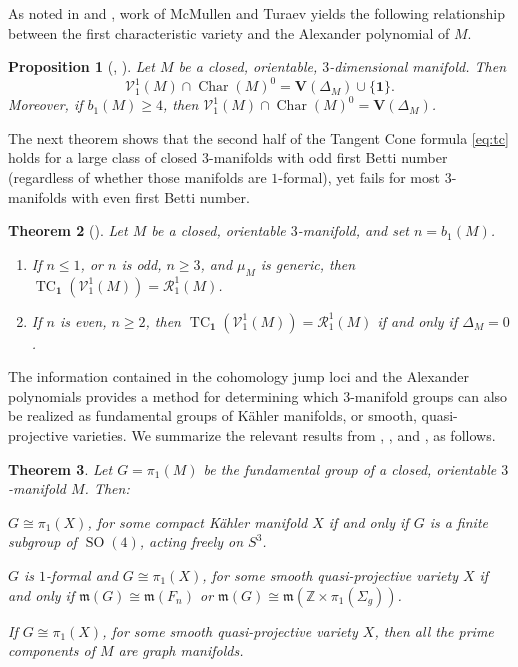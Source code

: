\documentclass{article}
\numberwithin{equation}{section}
\newtheorem{theorem}{Theorem}[section]
\newtheorem{proposition}[theorem]{Proposition}
\theoremstyle{definition}
\newcommand{\Z}{\mathbb{Z}}
\newcommand{\VV}{\mathcal{V}}
\newcommand{\RR}{\mathcal{R}}
\newcommand{\m}{{\mathfrak{m}}}
\DeclareMathOperator{\TC}{TC}
\DeclareMathOperator{\Char}{Char}
\newcommand{\one}{\mathbf{1}}
\begin{document}
As noted in \cite{DPS-imrn} and \cite{Su-mm}, work of McMullen \cite{McM} and 
Turaev \cite{Tu} yields the following relationship between the first 
characteristic variety and the Alexander polynomial of $M$.

\begin{proposition}[\cite{DPS-imrn}, \cite{Su-mm}]
\label{prop:cv 3d}
Let $M$ be a closed, orientable, $3$-dimensional manifold.  Then 
\begin{equation}
\label{eq:vdel}
\VV^1_1(M)\cap \Char(M)^0=\mathbf{V}(\Delta_M) \cup \{\one\}.
\end{equation}
Moreover, if $b_1(M)\ge 4$,  then $\VV^1_1(M)\cap 
\Char(M)^0= \mathbf{V}(\Delta_M)$.  
\end{proposition}

The next theorem shows that the second half of the Tangent Cone formula 
\eqref{eq:tc} holds for a large class of closed $3$-manifolds with odd first 
Betti number (regardless of whether those manifolds are $1$-formal), 
yet fails for most $3$-manifolds with even first Betti number.

\begin{theorem}[\cite{Su-mm}]
\label{thm:tc 3d}
Let $M$ be a closed, orientable $3$-manifold, and 
set $n=b_1(M)$. 
\begin{enumerate}
\item \label{odd} 
If $n\le 1$, or $n$ is odd, $n\ge 3$, and $\mu_M$ 
is generic, then $\TC_{\one}(\VV^1_1(M))=\RR^1_1(M)$.
\item \label{even} 
If $n$ is even, $n\ge 2$, then 
$\TC_{\one}(\VV^1_1(M))= \RR^1_1(M)$ if 
and only if $\Delta_M= 0$.
\end{enumerate}
\end{theorem}

The information contained in the cohomology jump loci and 
the Alexander polynomials provides a method for determining 
which $3$-manifold groups can also be realized as fundamental groups 
of K\"{a}hler manifolds, or smooth, quasi-projective varieties. 
We summarize the relevant results from \cite{DS-jems}, 
\cite{DPS-mz}, and \cite{FS}, as follows.

\begin{theorem}
\label{thm:3d-k-qp}
Let $G=\pi_1(M)$ be the fundamental group of a closed, orientable 
$3$-manifold $M$. Then:
\begin{description}[labelindent=14pt]
\item [\cite{DS-jems}]
$G\cong \pi_1(X)$, for some compact K\"{a}hler manifold $X$ if and only if 
$G$ is a finite subgroup of $\operatorname{SO}(4)$, acting freely on $S^3$.

\item [\cite{DPS-mz}]
$G$ is $1$-formal and $G\cong \pi_1(X)$, for some smooth quasi-projective
variety $X$ if and only if
$\m(G)\cong \m(F_n)$ or $\m(G)\cong \m(\Z\times \pi_1(\Sigma_g))$.

\item [\cite{FS}]
If $G\cong \pi_1(X)$, for some smooth quasi-projective
variety $X$, then all the prime components
of $M$ are graph manifolds.
\end{description}
\end{theorem}
\end{document}

